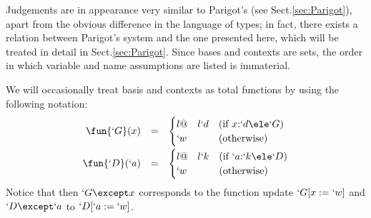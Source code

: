 \documentclass{lmcs}
\begin{document}
Judgements are in appearance very similar to Parigot's (see Sect.\skp\ref{sec:Parigot}), apart from the obvious difference in the language of types; in fact, there exists a relation between Parigot's system and the one presented here, which will be treated in detail in Sect.\skp\ref{sec:Parigot}.
Since bases and contexts are sets, the order in which variable and name assumptions are listed is immaterial.

We will occasionally treat basis and contexts as total functions by using the following notation:
%
 \[ \begin{array}{rcl}
 \fun{`G}(x) &=& 
 \begin{cases}{l@{\quad}l}
	`d & (\textrm{if }x{:}`d \ele `G) \\
	`w & (\textrm{otherwise})
 \end{cases}
\\ [4mm]
 \fun{`D }(`a) &=& 
 \begin{cases}{l@{\quad}l}
	`k & (\textrm{if }`a{:}`k \ele `D) \\
	`w & (\textrm{otherwise})
 \end{cases}
 \end{array} \]
Notice that then $`G \except x $ corresponds to the function update $`G[x:= `w]$ and $`D \except `a$ to $`D[`a:= `w]$.
\end{document}
